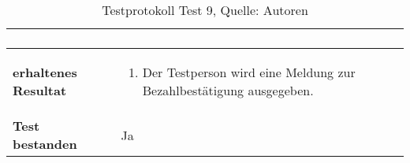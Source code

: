 \begin{table}[H]
\begin{tabularx}{\textwidth}{|l|X|}
\begin{minipage}[t]{0.6\textwidth}
\begin{enumerate}
			\end{enumerate}
			\end{minipage} \\
			\hline
			\textbf{erhaltenes Resultat} &
			\begin{minipage}[t]{0.6\textwidth}
				\begin{enumerate}
					\item Der Testperson wird eine Meldung zur Bezahlbestätigung ausgegeben. 
				\end{enumerate}
			\end{minipage} \\
			\hline
			\textbf{Test bestanden} & Ja \\
			\hline
		\end{tabularx}
		\caption{ \label{tbl: testprotokoll9}Testprotokoll Test 9, Quelle: Autoren}
	\end{table}

